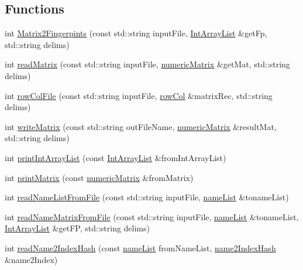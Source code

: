 \subsection*{Functions}
\begin{DoxyCompactItemize}
\item 
int \hyperlink{namespacegift_acda370474a9ba8a4efccf7e28447692d}{Matrix2\+Fingerpints} (const std\+::string input\+File, \hyperlink{namespacegift_a98b589c33d80e413fceaf8afd8e25815}{Int\+Array\+List} \&get\+Fp, std\+::string delims)
\item 
int \hyperlink{namespacegift_a12372122de14f2490d34c339aa649ff5}{read\+Matrix} (const std\+::string input\+File, \hyperlink{namespacegift_a4e11987023733fe14bdabd0b52e78583}{numeric\+Matrix} \&get\+Mat, std\+::string delims)
\item 
int \hyperlink{namespacegift_a56a9882f4dbf0b4a9ddcdbb0b402ded3}{row\+Col\+File} (const std\+::string input\+File, \hyperlink{classgift_1_1row_col}{row\+Col} \&matrix\+Rec, std\+::string delims)
\item 
int \hyperlink{namespacegift_ad3b6bc92b42b55cda39a5b521a16183a}{write\+Matrix} (const std\+::string out\+File\+Name, \hyperlink{namespacegift_a4e11987023733fe14bdabd0b52e78583}{numeric\+Matrix} \&result\+Mat, std\+::string delims)
\item 
int \hyperlink{namespacegift_aab9980531c0e93e44623307a3ce9d9bd}{print\+Int\+Array\+List} (const \hyperlink{namespacegift_a98b589c33d80e413fceaf8afd8e25815}{Int\+Array\+List} \&from\+Int\+Array\+List)
\item 
int \hyperlink{namespacegift_ac2fa13726f491f22f500543f25888735}{print\+Matrix} (const \hyperlink{namespacegift_a4e11987023733fe14bdabd0b52e78583}{numeric\+Matrix} \&from\+Matrix)
\item 
int \hyperlink{namespacegift_afe4c9e96cae6d6ed3f921e117498e5a5}{read\+Name\+List\+From\+File} (const std\+::string input\+File, \hyperlink{namespacegift_a62f85efaab3bff48335863ae0670c7a7}{name\+List} \&toname\+List)
\item 
int \hyperlink{namespacegift_ab7799569190a9131476f02f9a78539fb}{read\+Name\+Matrix\+From\+File} (const std\+::string input\+File, \hyperlink{namespacegift_a62f85efaab3bff48335863ae0670c7a7}{name\+List} \&toname\+List, \hyperlink{namespacegift_a98b589c33d80e413fceaf8afd8e25815}{Int\+Array\+List} \&get\+FP, std\+::string delims)
\item 
int \hyperlink{namespacegift_a97b7387cf2481a5a3cad95ea5b5da1fc}{read\+Name2\+Index\+Hash} (const \hyperlink{namespacegift_a62f85efaab3bff48335863ae0670c7a7}{name\+List} from\+Name\+List, \hyperlink{namespacegift_a88a96011620ed18b8321bc36a816773c}{name2\+Index\+Hash} \&name2\+Index)

\end{DoxyCompactItemize}
